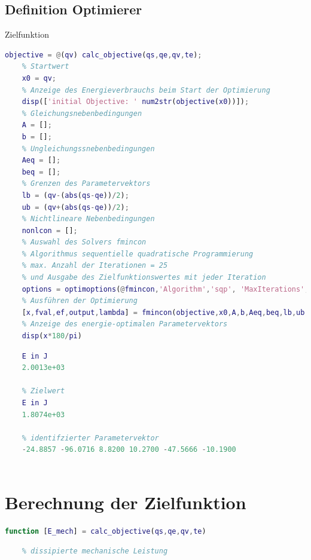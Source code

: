 \subsection{Definition Optimierer}
%
\begin{par}
	Zielfunktion
\end{par} \vspace{1em}
\begin{lstlisting}[language=Matlab, numbers=none]
	objective = @(qv) calc_objective(qs,qe,qv,te);
	% Startwert
	x0 = qv;
	% Anzeige des Energieverbrauchs beim Start der Optimierung
	disp(['initial Objective: ' num2str(objective(x0))]);
	% Gleichungsnebenbedingungen
	A = [];
	b = [];
	% Ungleichungssnebenbedingungen
	Aeq = [];
	beq = [];
	% Grenzen des Parametervektors
	lb = (qv-(abs(qs-qe))/2);
	ub = (qv+(abs(qs-qe))/2);
	% Nichtlineare Nebenbedingungen
	nonlcon = [];
	% Auswahl des Solvers fmincon
	% Algorithmus sequentielle quadratische Programmierung
	% max. Anzahl der Iterationen = 25
	% und Ausgabe des Zielfunktionswertes mit jeder Iteration
	options = optimoptions(@fmincon,'Algorithm','sqp', 'MaxIterations', 25,'PlotFcn',@optimplotfval);
	% Ausführen der Optimierung
	[x,fval,ef,output,lambda] = fmincon(objective,x0,A,b,Aeq,beq,lb,ub,nonlcon,options);
	% Anzeige des energie-optimalen Parametervektors
	disp(x*180/pi)
\end{lstlisting}
\color{lightgray} \begin{lstlisting}[language=Matlab, numbers=none]
	% Startwert
	E in J
	2.0013e+03
	
	% Zielwert
	E in J
	1.8074e+03
	
	% identifzierter Parametervektor
	-24.8857 -96.0716 8.8200 10.2700 -47.5666 -10.1900
	
\end{lstlisting} \color{black}
%
%
%
\setcounter{section}{6}
\section{Berechnung der Zielfunktion}
%
\label{add:zielfunktion}
\begin{lstlisting}[language=Matlab, numbers=none]
	function [E_mech] = calc_objective(qs,qe,qv,te)
\end{lstlisting}
\begin{lstlisting}[language=Matlab, numbers=none]
	% Berechung der Zielfunktion (Energieverbrauch) über die nicht
	% dissipierte mechanische Leistung
\end{lstlisting}
%

